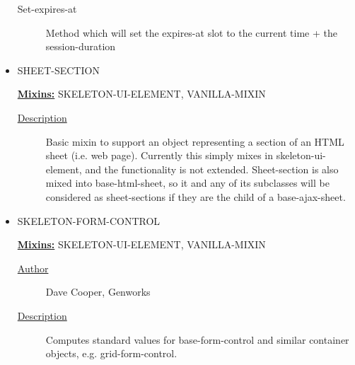 \documentclass [11pt]{book}
\begin{document}
\begin{itemize}
\begin{description}
\item [Set-expires-at]
Method which will set the expires-at slot to the current time + the session-duration


\end{description}







\item {}SHEET-SECTION


\textbf{
\underline{Mixins:}} SKELETON-UI-ELEMENT, VANILLA-MIXIN





\begin{description}

\item [
\underline{Description}]


Basic mixin to support an object 
representing a section of an HTML sheet (i.e. web page). Currently 
this simply mixes in skeleton-ui-element, and the functionality is not 
extended. Sheet-section is also mixed into base-html-sheet, so it and 
any of its subclasses will be considered as sheet-sections if they 
are the child of a base-ajax-sheet.





\end{description}









\item {}SKELETON-FORM-CONTROL


\textbf{
\underline{Mixins:}} SKELETON-UI-ELEMENT, VANILLA-MIXIN





\begin{description}

\item [
\underline{Author}]


Dave Cooper, Genworks



\item [
\underline{Description}]


Computes standard values for base-form-control and similar container objects, e.g. grid-form-control.


\end{description}
\end{itemize}
\end{document}
